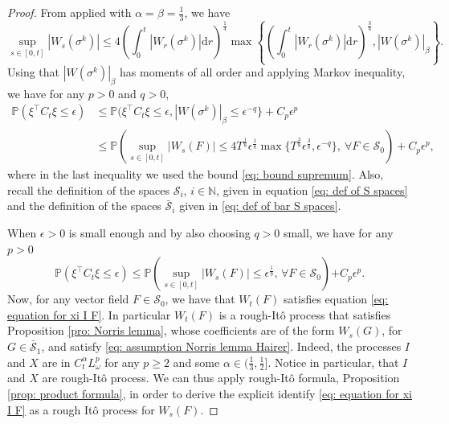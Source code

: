 \documentclass[11pt,a4paper]{article}
\newcommand{\rd}{\mathrm{d}}
\theoremstyle{plain}
\begin{document}
\begin{proof}
    From \cite[Lemma 4.10]{hairer2011malliavins} applied with $\alpha = \beta = \frac{1}{3}$, we have
    \begin{equation}
        \label{eq: bound supremum}
        \sup_{s\in[0,t]}|W_s(\sigma^k)| \leq 4 \left(\int_0^t |W_r(\sigma^k)| \rd r\right)^{\frac{1}{4}} \max \left\{
        \left(\int_0^t |W_r(\sigma^k) |
        \rd r \right)^{\frac{3}{4}},  |W(\sigma^k)|_{\beta}
        \right\}.
    \end{equation}
    Using that $|W(\sigma^k)|_{\beta}$ has moments of all order and applying Markov inequality, we have for any $p > 0$ and $q > 0$,
    \begin{align*}
         \mathbb{P} (\xi^{\top} C_t \xi \leq \epsilon)
         & \leq \mathbb{P} (\xi^{\top} C_t \xi \leq \epsilon, |W(\sigma^k)|_{\beta} \leq \epsilon^{-q}\}
         + C_p \epsilon^p\\
         & \leq \mathbb{P}(
         \sup_{s\in[0,t]}|W_s(F)| \leq 4 T^{\frac{1}{8}}\epsilon^{\frac{1}{8}} \max \{
            T^{\frac{3}{8}}\epsilon^{\frac{3}{8}}, \epsilon^{-q}\}, \ \forall F \in \mathcal{S}_0
         ) + C_p \epsilon^p,
    \end{align*}
    where in the last inequality we used the bound \eqref{eq: bound supremum}. Also, recall the definition of the spaces $\mathcal{S}_i$, $i\in \mathbb{N}$, given in equation \eqref{eq: def of S spaces} and the definition of the spaces $\bar{\mathcal{S}}_i$ given in \eqref{eq: def of bar S spaces}.

    When $\epsilon > 0$ is small enough and by also choosing $q>0$ small, we have {for any $p > 0$}
    \begin{equation*}
        \mathbb{P} (\xi^{\top} C_t \xi \leq \epsilon)
        \leq \mathbb{P}(\sup_{s\in [0,t]}|W_s(F)| \leq \epsilon^{\frac{1}{9}} , \, \forall F \in \mathcal{S}_0 ) { + C_p \epsilon^p}.
    \end{equation*}
    Now, for any vector field $F \in \mathcal{S}_0$, we have that $W_t(F)$ satisfies equation \eqref{eq: equation for xi I F}. In particular $W_t(F)$ is a rough-It\^o process that satisfies Proposition \ref{pro: Norris lemma}, whose coefficients are of the form $W_s(G)$, for $G\in \bar{\mathcal{S}}_1$, and satisfy \eqref{eq: assumption Norris lemma Hairer}. Indeed, the processes $I$ and $X$ are in $C^{\alpha}_tL^p_{\omega}$ for any $p\geq 2$ and some $\alpha \in (\frac{1}{3}, \frac{1}{2}]$. Notice in particular, that $I$ and $X$ are rough-It\^o process. We can thus apply rough-It\^o formula, Proposition \ref{prop: product formula}, in order to derive the explicit identify \eqref{eq: equation for xi I F} as a rough It\^o process for $W_s(F)$.


\end{proof}
\end{document}
